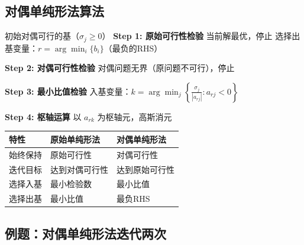 \subsection{对偶单纯形法算法}

\begin{algorithm}[H]
\caption{对偶单纯形法}
\begin{algorithmic}[1]
\Require 初始对偶可行的基（$\sigma_j \geq 0$）
    \State \textbf{Step 1: 原始可行性检验}
        \State 当前解最优，停止
    \EndIf
    \State 选择出基变量：$r = \arg\min_i \{b_i\}$（最负的RHS）
    
    \State \textbf{Step 2: 对偶可行性检验}
        \State 对偶问题无界（原问题不可行），停止
    \EndIf
    
    \State \textbf{Step 3: 最小比值检验}
    \State 入基变量：$k = \arg\min_j \left\{\frac{\sigma_j}{|a_{rj}|} : a_{rj} < 0\right\}$
    
    \State \textbf{Step 4: 枢轴运算}
    \State 以 $a_{rk}$ 为枢轴元，高斯消元
\EndWhile
\end{algorithmic}
\end{algorithm}

\begin{notebox}[对偶单纯形法与原始单纯形法的对比]
\begin{table}[H]
\centering
\begin{tabular}{@{}lll@{}}
\toprule
\textbf{特性} & \textbf{原始单纯形法} & \textbf{对偶单纯形法} \\
\midrule
始终保持 & 原始可行性 & 对偶可行性 \\
迭代目标 & 达到对偶可行性 & 达到原始可行性 \\
选择入基 & 最小检验数 & 最小比值 \\
选择出基 & 最小比值 & 最负RHS \\
\bottomrule
\end{tabular}
\end{table}
\end{notebox}

\subsection{例题：对偶单纯形法迭代两次}

